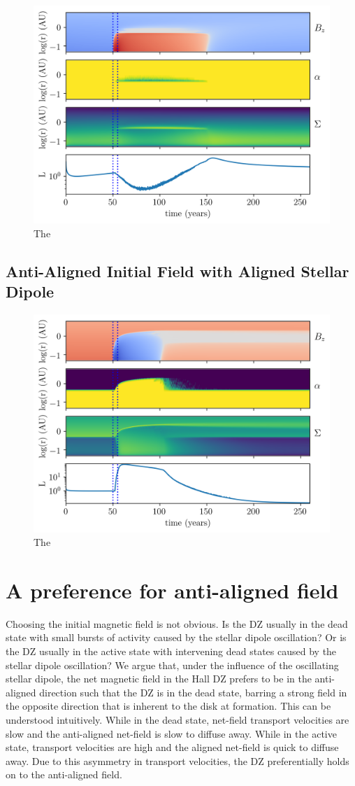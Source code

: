\begin{figure}[h!]
\centering
\includegraphics[width=0.6\columnwidth]{figs/figsChapter3/run3101/MST1.png}
\caption{The}
\label{fiStExample}
\end{figure}
 

\subsection{Anti-Aligned Initial Field with Aligned Stellar Dipole}
 
\begin{figure}[h!]
\centering
\includegraphics[width=0.6\columnwidth]{figs/figsChapter3/run3100/MST1.png}
\caption{The}
\label{fiStExample}
\end{figure}



 
 
\section{A preference for anti-aligned field}
Choosing the initial magnetic field is not obvious.  Is the DZ usually in the dead state with small bursts of activity caused by the stellar dipole oscillation?  Or is the DZ usually in the active state with intervening dead states caused by the stellar dipole oscillation?  We argue that, under the influence of the oscillating stellar dipole, the net magnetic field in the Hall DZ prefers to be in the anti-aligned direction such that the DZ is in the dead state, barring a strong field in the opposite direction that is inherent to the disk at formation.  This can be understood intuitively.  While in the dead state, net-field transport velocities are slow and the anti-aligned net-field is slow to diffuse away.  While in the active state, transport velocities are high and the aligned net-field is quick to diffuse away.  Due to this asymmetry in transport velocities, the DZ preferentially holds on to the anti-aligned field.

